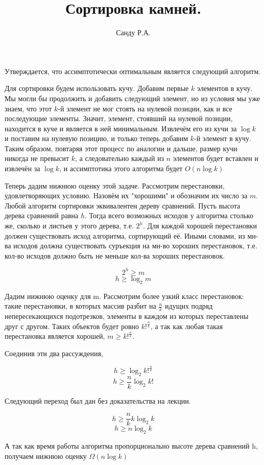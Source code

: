 \documentclass[11pt]{article}
\title{Сортировка камней.}
\author{Санду Р.А.}
\begin{document}
\maketitle

Утверждается, что ассимптотически оптимальным является следующий алгоритм.

Для сортировки будем использовать кучу. Добавим первые $k$ элементов в кучу. Мы могли бы продолжить и добавить следующий элемент, но из условия мы уже знаем, что этот $k$-й элемент не мог стоять на нулевой позиции, как и все последующие элементы. Значит, элемент, стоявший на нулевой позиции, находится в куче и является в ней минимальным. Извлечём его из кучи за $\log{k}$ и поставим на нулевую позицию, и только теперь добавим $k$-й элемент в кучу.
Таким образом, повтаряя этот процесс по аналогии и дальше, размер кучи никогда не превысит $k$, а следовательно каждый из $n$ элементов будет вставлен и извлечён за $\log{k}$, и ассимптотика этого алгоритма будет $O(n\log{k})$

Теперь дадим нижнюю оценку этой задаче. Рассмотрим перестановки, удовлетворяющих условию. Назовём их "хорошими" и обозначим их число за $m$. Любой алгоритм сортировки эквивалентен дереву сравнений. Пусть высота дерева сравнений равна $h$. Тогда всего возможных исходов у алгоритма столько же, сколько и листьев у этого дерева, т.е. $2^h$. Для каждой хорошей перестановки должен существовать исход алгоритма, сортирующий её. Иными словами, из мн-ва исходов должна существовать суръекция на мн-во хороших перестановок, т.е. кол-во исходов должно быть не меньше кол-ва хороших перестановок.

\[
	2^h \geq m
\]
\[
	h \geq \log_2{m}
\]

Дадим нижнюю оценку для m. Рассмотрим более узкий класс перестановок: такие перестановки, в которых массив разбит на $\frac{n}{k}$ идущих подряд непересекающихся подотрезков, элементы в каждом из которых переставлены друг с другом. Таких объектов будет ровно $k!^\frac{n}{k}$, а так как любая такая перестановка является хорошей, $m \geq k!^\frac{n}{k}$.

Соединив эти два рассуждения,

\[
	h \geq \log_2{k!^\frac{n}{k}}
\]
\[
	h \geq \frac{n}{k}\log_2{k!}
\]

Следующий переход был дан без доказательства на лекции.

\[
	h \geq \frac{n}{k}k\log_2{k}
\]
\[
	h \geq n\log_2{k}
\]

А так как время работы алгоритма пропорционально высоте дерева сравнений h, получаем нижнюю оценку $\Omega(n\log{k})$
\end{document}
